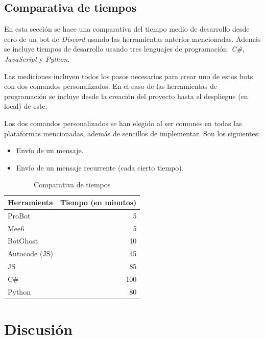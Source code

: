 \subsection{Comparativa de tiempos}

En esta sección se hace una comparativa del tiempo medio de desarrollo desde cero de un bot de \textit{Discord} usando las herramientas anterior mencionadas. Además se incluye tiempos de desarrollo usando tres lenguajes de programación: \textit{C\#}, \textit{JavaScript} y \textit{Python}.

Las mediciones incluyen todos los pasos necesarios para crear uno de estos bots con dos comandos personalizados. En el caso de las herramientas de programación se incluye desde la creación del proyecto hasta el despliegue (en local) de este.

Los dos comandos personalizados se han elegido al ser comunes en todas las plataformas mencionadas, además de sencillos de implementar. Son los siguientes:

\begin{itemize}
	\item Envío de un mensaje.
	\item Envío de un mensaje recurrente (cada cierto tiempo).
\end{itemize}

\begin{table}[H]
    \centering
    \def\arraystretch{1.25}
    \begin{adjustbox}{max width=\textwidth}
    \begin{tabularx}{200px}{|l|R|}
    \hline
        \textbf{Herramienta} & \textbf{Tiempo (en minutos)} \\ \hline
    \hline
        ProBot & 5 \\ \hline
        Mee6 & 5 \\ \hline
        BotGhost & 10 \\ \hline
    \hline
        Autocode (JS) & 45 \\ \hline
    \hline
        JS & 85 \\ \hline
        C\# & 100 \\ \hline
        Python & 80 \\ \hline
    \end{tabularx}
    \end{adjustbox}
    \caption{Comparativa de tiempos}
\end{table}

\section{Discusión}

